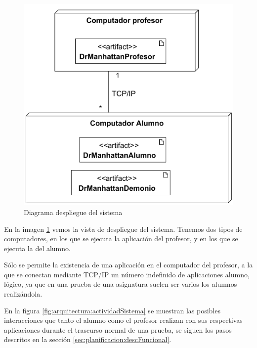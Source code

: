 \begin{figure}
    \centering
    \includegraphics[width=\linewidth]{arquitectura/despliegueSistema}
    \caption{Diagrama despliegue del sistema}
    \label{fig:arquitectura:despliegueSistema}
\end{figure}

En la imagen \ref{fig:arquitectura:despliegueSistema} vemos la vista de despliegue del sistema. Tenemos dos tipos de computadores, en los que se ejecuta la aplicación del profesor, y en los que se ejecuta la del alumno.
\newline

Sólo se permite la existencia de una aplicación en el computador del profesor, a la que se conectan mediante TCP/IP un número indefinido de aplicaciones alumno, lógico, ya que en una prueba de una asignatura suelen ser varios los alumnos realizándola.
\newline


En la figura \ref{fig:arquitectura:actividadSistema} se muestran las posibles interacciones que tanto el alumno como el profesor realizan con sus respectivas aplicaciones durante el trascurso normal de una prueba, se siguen los pasos descritos en la sección \ref{sec:planificacion:descFuncional}.


